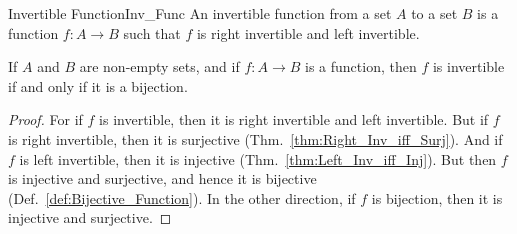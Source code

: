         \begin{fdefinition}{Invertible Function}{Inv_Func}
            An invertible function from a set $A$ to a set $B$ is a function
            $f:A\rightarrow{B}$ such that $f$ is right invertible and left
            invertible.
        \end{fdefinition}
        \begin{theorem}
            If $A$ and $B$ are non-empty sets, and if $f:A\rightarrow{B}$ is a
            function, then $f$ is invertible if and only if it is a bijection.
        \end{theorem}
        \begin{proof}
            For if $f$ is invertible, then it is right invertible and left
            invertible. But if $f$ is right invertible, then it is surjective
            (Thm.~\ref{thm:Right_Inv_iff_Surj}). And if $f$ is left invertible,
            then it is injective (Thm.~\ref{thm:Left_Inv_iff_Inj}). But then
            $f$ is injective and surjective, and hence it is bijective
            (Def.~\ref{def:Bijective_Function}). In the other direction, if $f$
            is bijection, then it is injective and surjective.
        \end{proof}
